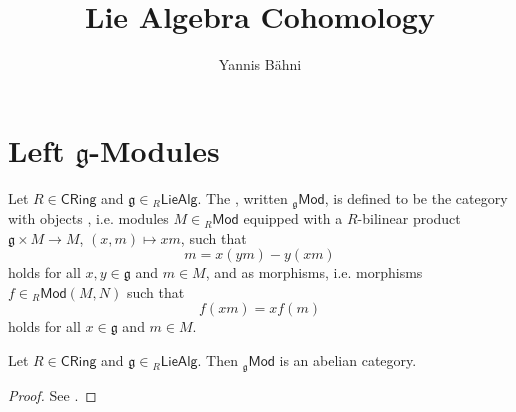 

\setcounter{section}{1}

\title{Lie Algebra Cohomology}
\author{Yannis B\"{a}hni}
\address[Yannis B\"{a}hni]{University of Zurich, R\"{a}mistrasse 71, 8006 Zurich}



\begin{abstract}
\end{abstract}

\maketitle

\tableofcontents

\section*{Left $\mathfrak{g}$-Modules}

\begin{definition}
	Let $R \in \mathsf{CRing}$ and $\mathfrak{g} \in {_{R}\mathsf{LieAlg}}$. The , written $_{\mathfrak{g}}\mathsf{Mod}$, is defined to be the category with objects , i.e. modules $M \in {_{R}}\mathsf{Mod}$ equipped with a $R$-bilinear product $\mathfrak{g} \times M \to M$, $(x,m) \mapsto xm$, such that 
	\begin{equation*}
		[x,y]m = x(ym) - y(xm)
	\end{equation*}
	\noindent holds for all $x,y \in \mathfrak{g}$ and $m \in M$, and  as morphisms, i.e. morphisms $f \in {_{R}}\mathsf{Mod}(M,N)$ such that 
	\begin{equation*}
		f(xm) = xf(m)
	\end{equation*}
	\noindent holds for all $x \in \mathfrak{g}$ and $m \in M$.
\end{definition}

\begin{proposition}
	Let $R \in \mathsf{CRing}$ and $\mathfrak{g} \in {_{R}\mathsf{LieAlg}}$. Then $_{\mathfrak{g}}\mathsf{Mod}$ is an abelian category.
\end{proposition}

\begin{proof}
	See \cite[220]{weibel:homological_algebra:1994}.
\end{proof}

